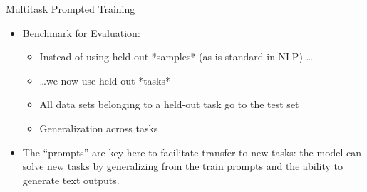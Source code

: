 \begin{frame}{Multitask Prompted Training}

\vfill

\begin{itemize}
    \item Benchmark for Evaluation:
        \begin{itemize}
        \item Instead of using held-out *samples* (as is
        standard in NLP) \ldots
        \item \ldots we now use held-out *tasks*
            \item All data sets belonging to a held-out task go to the test set
            \item Generalization across tasks %
        \end{itemize}
    \item The ``prompts'' are key here to
facilitate
        transfer to new tasks:  the model can solve new
        tasks by generalizing from  the train prompts and the ability to generate text outputs.
\end{itemize}

\vfill

\end{frame}





